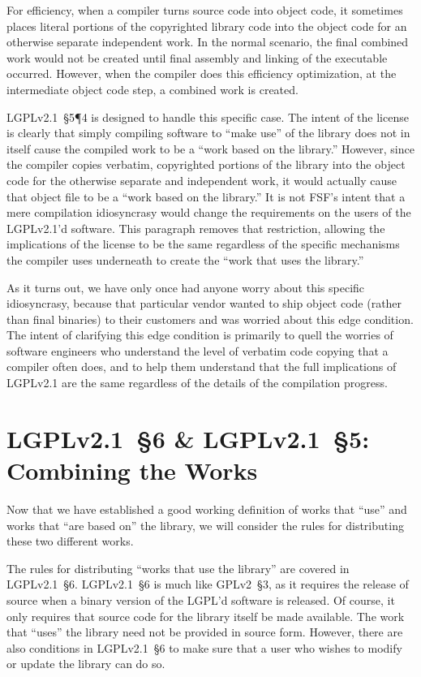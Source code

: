 For efficiency, when a compiler turns source code into object code, it
sometimes places literal portions of the copyrighted library code into the
object code for an otherwise separate independent work. In the normal
scenario, the final combined work would not be created until final assembly and
linking of the executable occurred. However, when the compiler does this
efficiency optimization, at the intermediate object code step, a
combined work is created.

LGPLv2.1~\S5\P4 is designed to handle this specific case. The intent of
the license is clearly that simply compiling software to ``make use'' of
the library does not in itself cause the compiled work to be a ``work
based on the library.''  However, since the compiler copies verbatim,
copyrighted portions of the library into the object code for the otherwise
separate and independent work, it would actually cause that object file to be a
``work based on the library.''  It is not FSF's intent that a mere
compilation idiosyncrasy would change the requirements on the users of the
LGPLv2.1'd software. This paragraph removes that restriction, allowing the
implications of the license to be the same regardless of the specific
mechanisms the compiler uses underneath to create the ``work that uses the
library.''

As it turns out, we have only once had anyone worry about this specific
idiosyncrasy, because that particular vendor wanted to ship object code
(rather than final binaries) to their customers and was worried about
this edge condition. The intent of clarifying this edge condition is
primarily to quell the worries of software engineers who understand the
level of verbatim code copying that a compiler often does, and to help
them understand that the full implications of LGPLv2.1 are the same regardless
of the details of the compilation progress.

\section{LGPLv2.1~\S6 \& LGPLv2.1~\S5: Combining the Works}
\label{lgpl-section-6}
Now that we have established a good working definition of works that
``use'' and works that ``are based on'' the library, we will consider the
rules for distributing these two different works.

The rules for distributing ``works that use the library'' are covered in
LGPLv2.1~\S6\@. LGPLv2.1~\S6 is much like GPLv2~\S3, as it requires the release
of source when a binary version of the LGPL'd software is released. Of
course, it only requires that source code for the library itself be made
available. The work that ``uses'' the library need not be provided in
source form. However, there are also conditions in LGPLv2.1~\S6 to make sure
that a user who wishes to modify or update the library can do so.

